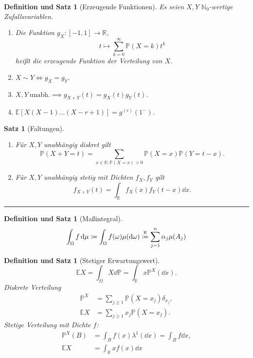 \documentclass[a4paper]{article}
\newcounter{Sec}
\theoremstyle{marginbreak}
\newtheorem{satz}[definition]{Satz}
\newtheorem{defsatz}[definition]{Definition und Satz}
\newcommand{\sep}{%
	\rule{\textwidth}{0.3pt}%
	\stepcounter{Sec}%
	}
\renewcommand{\P}{\mathbb{P}}
\newcommand{\R}{\mathbb{R}}
\newcommand{\E}{\mathbb{E}}
\newcommand{\N}{\mathbb{N}}
\begin{document}
	\begin{defsatz}[Erzeugende Funktionen]
		Es seien $X, Y$ $\N_0$-wertige Zufallsvariablen.
		\begin{enumerate}[label=(\alph*)]
			\item Die Funktion $g_X\colon[-1,1]\to\mathbb{R}$,
				\begin{equation*}
					t\mapsto \sum_{k=0}^\infty\P(X=k)t^k
				\end{equation*}
				heißt die erzeugende Funktion der Verteilung von $X$.
			\item $X\sim Y\iff g_X=g_Y$.
			\item $X, Y~\text{unabh.}\implies g_{X+Y}(t)=g_X(t)g_Y(t)$.
			\item $\E[X(X-1)\dots(X-r+1)] = g^{(r)}(1^-)$.
		\end{enumerate}
	\end{defsatz}
	\begin{satz}[Faltungen]
		\begin{enumerate}[label=(\alph*)]
			\item Für $X, Y$ unabhängig diskret gilt
				\begin{equation*}
					\P(X + Y = t) = \sum_{x\in\R:\P(X=x)>0}\P(X=x)\P(Y=t-x).
				\end{equation*}
			\item Für $X, Y$ unabhängig stetig mit Dichten $f_X, f_Y$ gilt
				\begin{equation*}
					f_{X+Y}(t) = \int_\R f_X(x)f_Y(t-x)\dd{x}.
				\end{equation*}
		\end{enumerate}
	\end{satz}
	\sep
	\begin{defsatz}[Maßintegral]
		\begin{equation*}
			\int_\Omega f\dd{\mu} \coloneqq \int_\Omega f(\omega)\mu(\dd{\omega}) \stackrel{\aleph}{\coloneqq} \sum_{j=1}^n\alpha_j\mu(A_j)\\
		\end{equation*}
	\end{defsatz}
	\begin{defsatz}[Stetiger Erwartungswert]
		\begin{equation*}
			\E X = \int_\Omega X\dd{\P} = \int_\R x\P^X(\dd{x}).
		\end{equation*}
		Diskrete Verteilung
		\begin{align*}
			\P^X&=\sum_{j\geq 1}\P(X=x_j)\delta_{x_j},\\
			\E X&=\sum_{j\geq 1}x_j\P(X=x_j).
		\end{align*}
		Stetige Verteilung mit Dichte $f$:
		\begin{align*}
			\P^X(B) &= \int_Bf(x)\lambda^1(\dd{x}) = \int_Bf\dd{x},\\
			\E X&=\int_\R xf(x)\dd{x}
		\end{align*}
	\end{defsatz}
\end{document}
